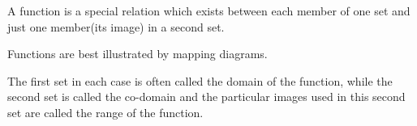 A function is a special relation which exists between each member of one 
set and just one member(its image) in a second set.

\par
Functions are best illustrated by mapping diagrams.
\par
The first set in each case is often called the domain of the function, 
while the second set is called the co-domain and the particular images 
used in this second set are called the range of the function.